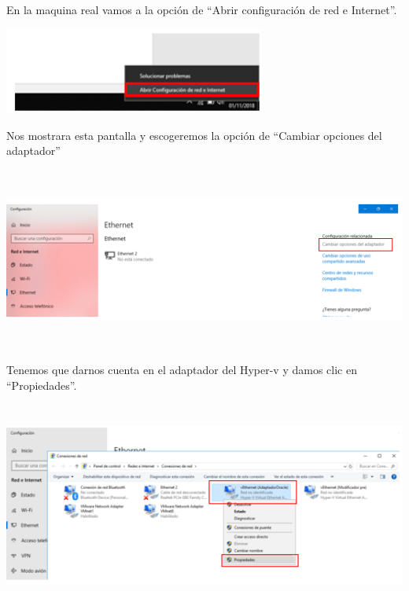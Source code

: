 \newpage

En la maquina real vamos a la opción de “Abrir configuración de red e Internet”.
	\begin{center}
		\includegraphics[width=8.6cm]{./Imagenes/31} 
	\end{center} 

\vspace{\baselineskip}

Nos mostrara esta pantalla y escogeremos la opción de “Cambiar opciones del adaptador” 
	\begin{center}
		\includegraphics[width=16.5cm, height=6cm]{./Imagenes/32} 
	\end{center} 

\vspace{\baselineskip}

Tenemos que darnos cuenta en el adaptador del Hyper-v y damos clic en “Propiedades”. 
	\begin{center}
		\includegraphics[width=16.5cm,height=6.8cm]{./Imagenes/33} 
	\end{center} 

